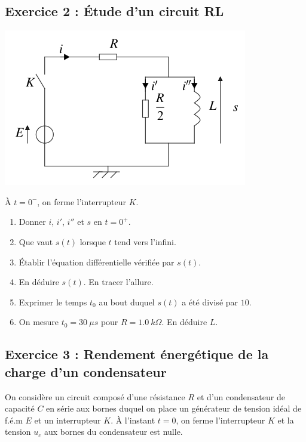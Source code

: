 \subsection{Exercice 2 : Étude d'un circuit RL}

\begin{minipage}[c]{\linewidth/2}
	\includegraphics[width=\linewidth]{Images/mpsi_s02_ex02.png}
\end{minipage}%
\begin{minipage}[c]{\linewidth/2}
	À $t=0^-$, on ferme l'interrupteur $K$.
	\begin{enumerate}
		\item Donner $i$, $i'$, $i''$ et $s$ en $t=0^+$.
		\item Que vaut $s(t)$ lorsque $t$ tend vers l'infini.
		\item Établir l'équation différentielle vérifiée par $s(t)$.
		\item En déduire $s(t)$. En tracer l'allure.
		\item Exprimer le temps $t_0$ au bout duquel $s(t)$ a été divisé par $10$.
		\item On mesure $t_0=\SI{30}{\mu s}$ pour $R=\SI{1.0}{k\Omega}$. En déduire $L$.
	\end{enumerate}
\end{minipage}

\subsection{Exercice 3 : Rendement énergétique de la charge d'un condensateur}

On considère un circuit composé d'une résistance $R$ et d'un condensateur de capacité $C$ en série aux bornes duquel on place un générateur de tension idéal de f.é.m $E$ et un interrupteur $K$. À l'instant $t=0$, on ferme l'interrupteur $K$ et la tension $u_c$ aux bornes du condensateur est nulle.

